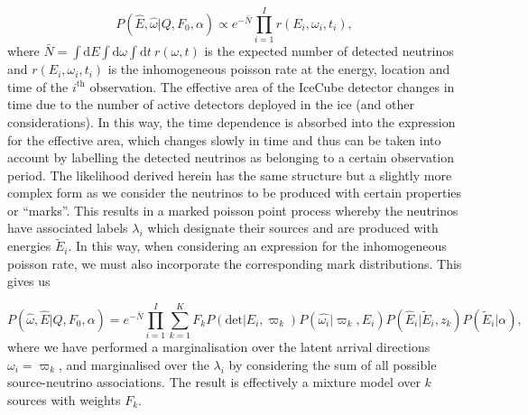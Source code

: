 \documentclass[fontsize=12pt]{article}
\begin{document}
\begin{equation}
P(\hat{E}, \hat{\omega} | Q, F_0, \alpha) \propto e^{-\bar{N}} \prod_{i=1}^{I} r(E_i, \omega_i, t_i),
\end{equation}
where $\bar{N} = \int \mathrm{d}E \int \mathrm{d}\omega \int \mathrm{d}t \ r(\omega, t)$ is the expected number of detected neutrinos and $r(E_i, \omega_i, t_i)$ is the inhomogeneous poisson rate at the energy, location and time of the $i^\mathrm{th}$ observation. The effective area of the IceCube detector changes in time due to the number of active detectors deployed in the ice (and other considerations). In this way, the time dependence is absorbed into the expression for the effective area, which changes slowly in time and thus can be taken into account by labelling the detected neutrinos as belonging to a certain observation period. The likelihood derived herein has the same structure but a slightly more complex form as we consider the neutrinos to be produced with certain properties or ``marks''. This results in a marked poisson point process whereby the neutrinos have associated labels $\lambda_i$ which designate their sources and are produced with energies $\tilde{E}_i$. In this way, when considering an expression for the inhomogeneous poisson rate, we must also incorporate the corresponding mark distributions. This gives us

\begin{equation}
P(\hat{\omega}, \hat{E} | Q, F_0, \alpha) = e^{-\bar{N}}\prod_{i=1}^I \sum_{k=1}^K F_k P(\mathrm{det} | E_i, \varpi_k) P(\hat{\omega_i} | \varpi_k, E_i) P(\hat{E}_i | \tilde{E}_i, z_k) P(\tilde{E}_i | \alpha),
\end{equation}
where we have performed a marginalisation over the latent arrival directions $\omega_i = \varpi_k$, and marginalised over the $\lambda_i$ by considering the sum of all possible source-neutrino associations. The result is effectively a mixture model over $k$ sources with weights $F_k$.
\end{document}

